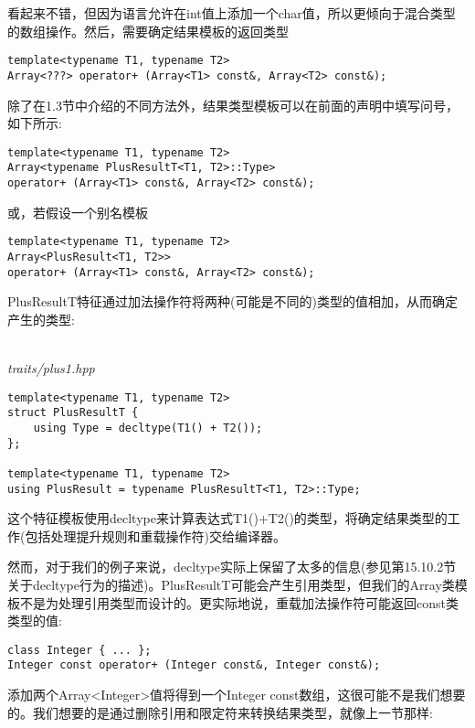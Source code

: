 看起来不错，但因为语言允许在int值上添加一个char值，所以更倾向于混合类型的数组操作。然后，需要确定结果模板的返回类型

\begin{lstlisting}[style=styleCXX]
template<typename T1, typename T2>
Array<???> operator+ (Array<T1> const&, Array<T2> const&);
\end{lstlisting}

除了在1.3节中介绍的不同方法外，结果类型模板可以在前面的声明中填写问号，如下所示:

\begin{lstlisting}[style=styleCXX]
template<typename T1, typename T2>
Array<typename PlusResultT<T1, T2>::Type>
operator+ (Array<T1> const&, Array<T2> const&);
\end{lstlisting}

或，若假设一个别名模板

\begin{lstlisting}[style=styleCXX]
template<typename T1, typename T2>
Array<PlusResult<T1, T2>>
operator+ (Array<T1> const&, Array<T2> const&);
\end{lstlisting}

PlusResultT特征通过加法操作符将两种(可能是不同的)类型的值相加，从而确定产生的类型:

\hspace*{\fill} \\ %
\noindent
\textit{traits/plus1.hpp}
\begin{lstlisting}[style=styleCXX]
template<typename T1, typename T2>
struct PlusResultT {
	using Type = decltype(T1() + T2());
};

template<typename T1, typename T2>
using PlusResult = typename PlusResultT<T1, T2>::Type;
\end{lstlisting}

这个特征模板使用decltype来计算表达式T1()+T2()的类型，将确定结果类型的工作(包括处理提升规则和重载操作符)交给编译器。

然而，对于我们的例子来说，decltype实际上保留了太多的信息(参见第15.10.2节关于decltype行为的描述)。PlusResultT可能会产生引用类型，但我们的Array类模板不是为处理引用类型而设计的。更实际地说，重载加法操作符可能返回const类类型的值:

\begin{lstlisting}[style=styleCXX]
class Integer { ... };
Integer const operator+ (Integer const&, Integer const&);
\end{lstlisting}

添加两个Array<Integer>值将得到一个Integer const数组，这很可能不是我们想要的。我们想要的是通过删除引用和限定符来转换结果类型，就像上一节那样:

